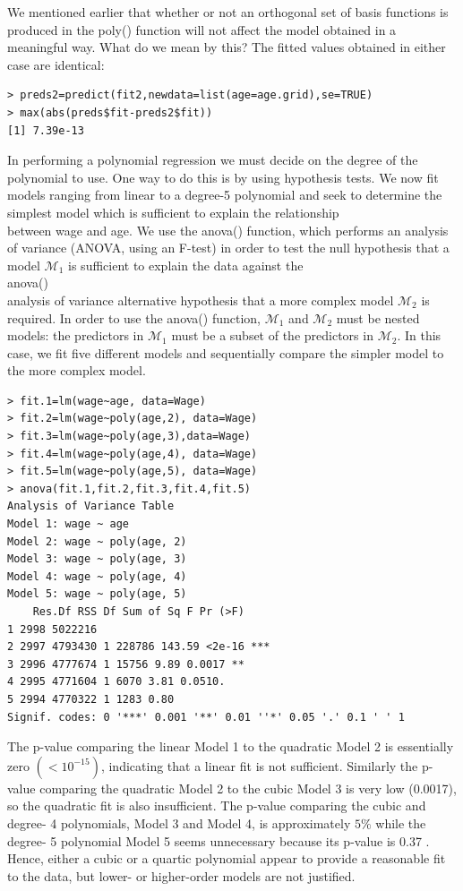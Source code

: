 \documentclass[10pt]{article}
\begin{document}
We mentioned earlier that whether or not an orthogonal set of basis functions is produced in the poly() function will not affect the model obtained in a meaningful way. What do we mean by this? The fitted values obtained in either case are identical:

\begin{verbatim}
> preds2=predict(fit2,newdata=list(age=age.grid),se=TRUE)
> max(abs(preds$fit-preds2$fit))
[1] 7.39e-13
\end{verbatim}

In performing a polynomial regression we must decide on the degree of the polynomial to use. One way to do this is by using hypothesis tests. We now fit models ranging from linear to a degree-5 polynomial and seek to determine the simplest model which is sufficient to explain the relationship\\
between wage and age. We use the anova() function, which performs an analysis of variance (ANOVA, using an F-test) in order to test the null hypothesis that a model $\mathcal{M}_{1}$ is sufficient to explain the data against the\\
anova()\\
analysis of variance alternative hypothesis that a more complex model $\mathcal{M}_{2}$ is required. In order to use the anova() function, $\mathcal{M}_{1}$ and $\mathcal{M}_{2}$ must be nested models: the predictors in $\mathcal{M}_{1}$ must be a subset of the predictors in $\mathcal{M}_{2}$. In this case, we fit five different models and sequentially compare the simpler model to the more complex model.

\begin{verbatim}
> fit.1=lm(wage~age, data=Wage)
> fit.2=lm(wage~poly(age,2), data=Wage)
> fit.3=lm(wage~poly(age,3),data=Wage)
> fit.4=lm(wage~poly(age,4), data=Wage)
> fit.5=lm(wage~poly(age,5), data=Wage)
> anova(fit.1,fit.2,fit.3,fit.4,fit.5)
Analysis of Variance Table
Model 1: wage ~ age
Model 2: wage ~ poly(age, 2)
Model 3: wage ~ poly(age, 3)
Model 4: wage ~ poly(age, 4)
Model 5: wage ~ poly(age, 5)
    Res.Df RSS Df Sum of Sq F Pr (>F)
1 2998 5022216
2 2997 4793430 1 228786 143.59 <2e-16 ***
3 2996 4777674 1 15756 9.89 0.0017 **
4 2995 4771604 1 6070 3.81 0.0510.
5 2994 4770322 1 1283 0.80
Signif. codes: 0 '***' 0.001 '**' 0.01 ''*' 0.05 '.' 0.1 ' ' 1
\end{verbatim}

The p-value comparing the linear Model 1 to the quadratic Model 2 is essentially zero $\left(<10^{-15}\right)$, indicating that a linear fit is not sufficient. Similarly the p-value comparing the quadratic Model 2 to the cubic Model 3 is very low (0.0017), so the quadratic fit is also insufficient. The p-value comparing the cubic and degree- 4 polynomials, Model 3 and Model 4, is approximately $5 \%$ while the degree- 5 polynomial Model 5 seems unnecessary because its p-value is 0.37 . Hence, either a cubic or a quartic polynomial appear to provide a reasonable fit to the data, but lower- or higher-order models are not justified.
\end{document}
